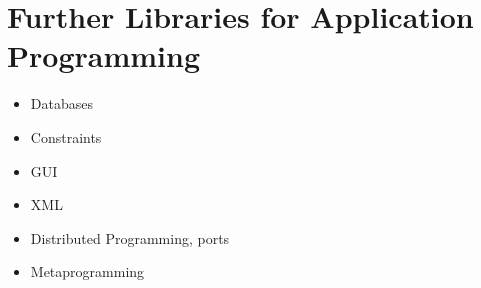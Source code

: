 \chapter{Further Libraries for Application Programming}

\begin{itemize}
\item Databases \cite{Hanus04JFLP}
\item Constraints
\item GUI \cite{Hanus00PADL}
\item XML
\item Distributed Programming, ports \cite{Hanus99PPDP}
\item Metaprogramming
\end{itemize}


